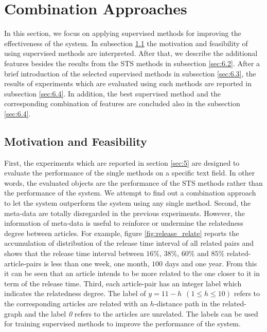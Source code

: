 \section{Combination Approaches}
\label{sec:6}

In this section, we focus on applying supervised methods for improving the effectiveness of the system. In subsection \ref{sec:6.1} the motivation and feasibility of using supervised methods are interpreted. After that, we describe the additional features besides the results from the STS methods in subsection \ref{sec:6.2}. After a brief introduction of the selected supervised methods in subsection \ref{sec:6.3}, the results of experiments which are evaluated using such methods are reported in subsection \ref{sec:6.4}. In addition, the best supervised method and the corresponding combination of features are concluded also in the subsection \ref{sec:6.4}.


\subsection{Motivation and Feasibility}
\label{sec:6.1}

First, the experiments which are reported in section \ref{sec:5} are designed to evaluate the performance of the single methods on a specific text field. In other words, the evaluated objects are the performance of the STS methods rather than the performance of the system. We attempt to find out a combination approach to let the system outperform the system using any single method. Second, the meta-data are totally disregarded in the previous experiments. However, the information of meta-data is useful to reinforce or undermine the relatedness degree between articles. For example, figure \ref{fig:release_relate} reports the accumulation of distribution of the release time interval of all related pairs and shows that the release time interval between $16\%$, $38\%$, $60\%$ and $85\%$ related-article-pairs is less than one week, one month, $100$ days and one year. From this it can be seen that an article intends to be more related to the one closer to it in term of the release time. Third, each article-pair has an integer label which indicates the relatedness degree. The label of $y=11 -h ~~(1 \le h \le 10)$ refers to the corresponding articles are related with an $h$-distance path in the related-graph and the label \textit{0} refers to the articles are unrelated. The labels can be used for training supervised methods to improve the performance of the system. 

